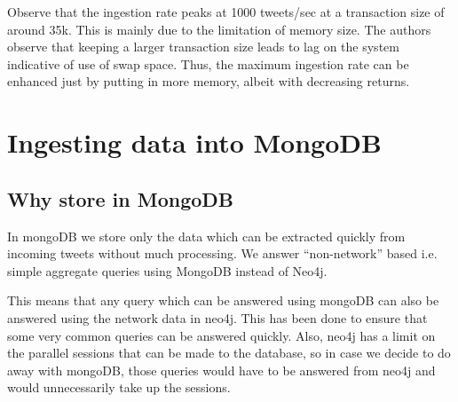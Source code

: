 \documentclass[letterpaper,10pt,english]{sphinxmanual}
\begin{document}
Observe that the ingestion rate peaks at 1000 tweets/sec at a transaction size of around 35k. This is mainly due to the limitation of memory size. The authors observe that keeping a larger transaction size leads to lag on the system indicative of use of swap space. Thus, the maximum ingestion rate can be enhanced just by putting in more memory, albeit with decreasing returns.


\chapter{Ingesting data into MongoDB}
\label{\detokenize{mongoDB_data_ingestion:ingesting-data-into-mongodb}}\label{\detokenize{mongoDB_data_ingestion::doc}}

\section{Why store in MongoDB}
\label{\detokenize{mongoDB_data_ingestion:why-store-in-mongodb}}
In mongoDB we store only the data which can be extracted quickly from incoming tweets without much processing. We answer “non-network” based i.e. simple aggregate queries using MongoDB instead of Neo4j.

This means that any query which can be answered using mongoDB can also be answered using the network data in neo4j. This has been done to ensure that some very common queries can be answered quickly. Also, neo4j has a limit on the parallel sessions that can be made to the database, so in case we decide to do away with mongoDB, those queries would have to be answered from neo4j and would unnecessarily take up the sessions.
\end{document}
